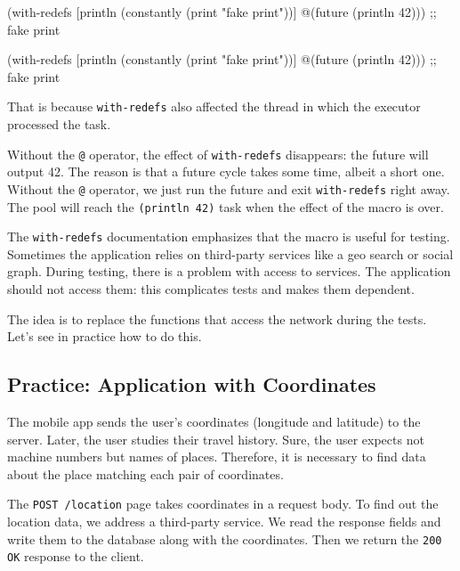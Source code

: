 \begin{english}
  \begin{clojure}
(with-redefs
  [println (constantly
             (print "fake print"))]
  @(future (println 42)))
;; fake print
  \end{clojure}
\end{english}

\else

\begin{english}
  \begin{clojure}
(with-redefs
  [println (constantly (print "fake print"))]
  @(future (println 42)))
;; fake print
  \end{clojure}
\end{english}

\fi

That is because \verb|with-redefs| also affected the thread in which the executor processed the task.

\mnoindent
Without the \verb|@| operator, the effect of \verb|with-redefs| disappears: the future will output 42. The reason is that a future cycle takes some time, albeit a short one.
Without the \verb|@| operator, we just run the future and exit \verb|with-redefs| right away.
The pool will reach the \verb|(println 42)| task when the effect of the macro is over.

The \verb|with-redefs| documentation emphasizes that the macro is useful for testing.
Sometimes the application relies on third-party services like a geo search or social graph.
During testing, there is a problem with access to services.
The application should not access them: this complicates tests and makes them dependent.

The idea is to replace the functions that access the network during the tests.
Let's see in practice how to do this.

\subsection{Practice: Application with Coordinates}


The mobile app sends the user's coordinates (longitude and latitude) to the server.
Later, the user studies their travel history.
Sure, the user expects not machine numbers but names of places.
Therefore, it is necessary to find data about the place matching each pair of coordinates.

The \verb|POST /location| page takes coordinates in a request body. To find out the location data, we address a third-party service. We read the response fields and write them to the database along with the coordinates. Then we return the \verb|200 OK| response to the client.

